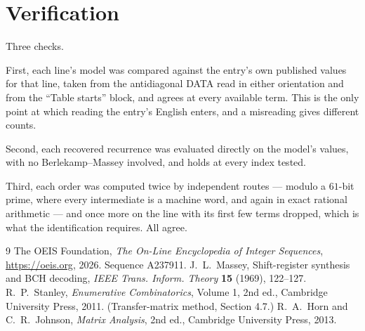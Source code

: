 \documentclass[11pt,a4paper]{article}
\theoremstyle{plain}
\theoremstyle{definition}
\begin{document}
\section{Verification}

Three checks.

First, each line's model was compared against the entry's own published values for that line,
taken from the antidiagonal DATA read in either orientation and from the ``Table starts''
block, and agrees at every available term. This is the only point at which reading the entry's
English enters, and a misreading gives different counts.

Second, each recovered recurrence was evaluated directly on the model's values, with no
Berlekamp--Massey involved, and holds at every index tested.

Third, each order was computed twice by independent routes --- modulo a $61$-bit prime, where
every intermediate is a machine word, and again in exact rational arithmetic --- and once more
on the line with its first few terms dropped, which is what the identification requires. All
agree.

\begin{thebibliography}{9}
 The OEIS Foundation, \emph{The On-Line Encyclopedia of Integer
Sequences}, \url{https://oeis.org}, 2026. Sequence A237911.
 J.~L.~Massey, Shift-register synthesis and BCH decoding, \emph{IEEE
Trans. Inform. Theory} \textbf{15} (1969), 122--127.
 R.~P.~Stanley, \emph{Enumerative Combinatorics}, Volume 1, 2nd ed.,
Cambridge University Press, 2011. (Transfer-matrix method, Section 4.7.)
 R.~A.~Horn and C.~R.~Johnson, \emph{Matrix Analysis}, 2nd ed., Cambridge
University Press, 2013.
\end{thebibliography}
\end{document}
